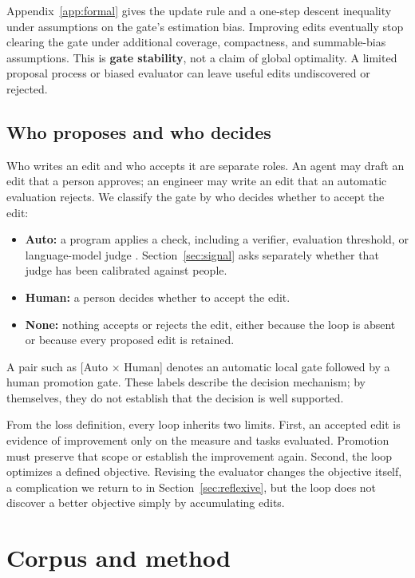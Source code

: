 \documentclass[
  11pt,
]{article}
\providecommand{\tightlist}{%
  \setlength{\itemsep}{0pt}\setlength{\parskip}{0pt}}
\begin{document}
Appendix~\ref{app:formal} gives the update rule and a one-step descent inequality under assumptions on the gate's estimation bias. Improving edits eventually stop clearing the gate under additional coverage, compactness, and summable-bias assumptions. This is \textbf{gate stability}, not a claim of global optimality. A limited proposal process or biased evaluator can leave useful edits undiscovered or rejected.

\subsection{Who proposes and who decides}\label{who-proposes-and-who-decides}

Who writes an edit and who accepts it are separate roles. An agent may draft an edit that a person approves; an engineer may write an edit that an automatic evaluation rejects. We classify the gate by who decides whether to accept the edit:

\begin{itemize}
\tightlist
\item
  \textbf{Auto:} a program applies a check, including a verifier, evaluation threshold, or language-model judge \cite{zheng2023judge}. Section~\ref{sec:signal} asks separately whether that judge has been calibrated against people.
\item
  \textbf{Human:} a person decides whether to accept the edit.
\item
  \textbf{None:} nothing accepts or rejects the edit, either because the loop is absent or because every proposed edit is retained.
\end{itemize}

A pair such as {[}Auto × Human{]} denotes an automatic local gate followed by a human promotion gate. These labels describe the decision mechanism; by themselves, they do not establish that the decision is well supported.

From the loss definition, every loop inherits two limits. First, an accepted edit is evidence of improvement only on the measure and tasks evaluated. Promotion must preserve that scope or establish the improvement again. Second, the loop optimizes a defined objective. Revising the evaluator changes the objective itself, a complication we return to in Section~\ref{sec:reflexive}, but the loop does not discover a better objective simply by accumulating edits.

\section{Corpus and method}\label{sec:method}
\end{document}
